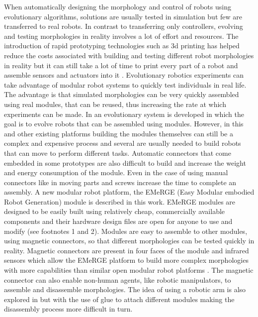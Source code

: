 \documentclass[sigconf]{acmart}
\begin{document}
When automatically designing the morphology and control of robots using evolutionary algorithms, solutions are usually tested in simulation but few are transferred to real robots. In contrast to transferring only controllers, evolving and testing morphologies in reality involves a lot of effort and resources. The introduction of rapid prototyping technologies such as 3d printing has helped reduce the costs associated with building and testing different robot morphologies in reality but it can still take a lot of time to print every part of a robot and assemble sensors and actuators into it \cite{Auerbach2014,Lipson2000}. Evolutionary robotics experiments can take advantage of modular robot systems to quickly test individuals in real life. The advantage is that simulated morphologies can be very quickly assembled using real modules, that can be reused, thus increasing the rate at which experiments can be made. In \cite{Faina2015} an evolutionary system is developed in which the goal is to evolve robots that can be assembled using modules. However, in this and other existing platforms building the modules themselves can still be a complex and expensive process and several are usually needed to build robots that can move to perform different tasks. Automatic connectors that come embedded in some prototypes are also difficult to build and increase the weight and energy consumption of the module. Even in the case of using manual connectors like in \cite{Faina2015} moving parts and screws increase the time to complete an assembly. A new modular robot platform, the EMeRGE (Easy Modular embodied Robot Generation) module is described in this work. EMeRGE modules are designed to be easily built using relatively cheap, commercially available components and their hardware design files are open for anyone to use and modify (see footnotes 1 and 2). Modules are easy to assemble to other modules, using magnetic connectors, so that different morphologies can be tested quickly in reality. Magnetic connectors are present in four faces of the module and infrared sensors which allow the EMeRGE platform to build more complex morphologies with more capabilities than similar open modular robot platforms \cite{Krupke2015}. The magnetic connector can also enable non-human agents, like robotic manipulators, to assemble and disassemble morphologies. The idea of using a robotic arm is also explored in \cite{Brodbeck2015} but with the use of glue to attach different modules making the disassembly process more difficult in turn. 
% 
% 
\end{document}
